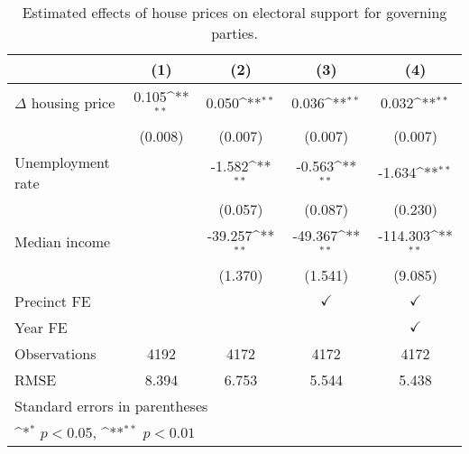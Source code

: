 \begin{table}[htbp]\centering
\def\sym#1{\ifmmode^{#1}\else\(^{#1}\)\fi}
\caption{Estimated effects of house prices on electoral support for governing parties.} \label{predv}
\begin{tabular}{l*{4}{c}}
\hline\hline
                    &\multicolumn{1}{c}{(1)}        &\multicolumn{1}{c}{(2)}        &\multicolumn{1}{c}{(3)}        &\multicolumn{1}{c}{(4)}        \\
\hline
$\Delta$ housing price&       0.105\sym{**}&       0.050\sym{**}&       0.036\sym{**}&       0.032\sym{**}\\
                    &     (0.008)        &     (0.007)        &     (0.007)        &     (0.007)        \\
[1em]
Unemployment rate   &                    &      -1.582\sym{**}&      -0.563\sym{**}&      -1.634\sym{**}\\
                    &                    &     (0.057)        &     (0.087)        &     (0.230)        \\
[1em]
Median income       &                    &     -39.257\sym{**}&     -49.367\sym{**}&    -114.303\sym{**}\\
                    &                    &     (1.370)        &     (1.541)        &     (9.085)        \\
[1em]
\hline Precinct FE  &                    &                    &$\checkmark$        &$\checkmark$        \\
[1em]
Year FE             &                    &                    &                    &$\checkmark$        \\
\hline
Observations        &        4192        &        4172        &        4172        &        4172        \\
RMSE                &       8.394        &       6.753        &       5.544        &       5.438        \\
\hline\hline
\multicolumn{5}{l}{\footnotesize Standard errors in parentheses}\\
\multicolumn{5}{l}{\footnotesize \sym{*} \(p<0.05\), \sym{**} \(p<0.01\)}\\
\end{tabular}
\end{table}
